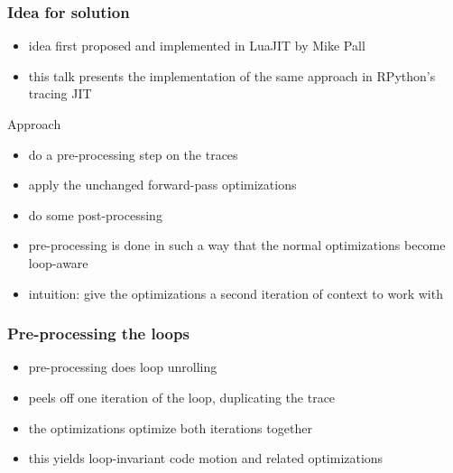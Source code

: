 \documentclass[utf8x]{beamer}
\begin{document}
\begin{frame}
  \frametitle{Idea for solution}
  \begin{itemize}
      \item idea first proposed and implemented in LuaJIT by Mike Pall
      \item this talk presents the implementation of the same approach in RPython's tracing JIT
  \end{itemize}
  \pause
  \begin{block}{Approach}
      \begin{itemize}
          \item do a pre-processing step on the traces
          \item apply the unchanged forward-pass optimizations
          \item do some post-processing
          \item pre-processing is done in such a way that the normal optimizations become loop-aware
          \item intuition: give the optimizations a second iteration of context to work with
      \end{itemize}
  \end{block}
\end{frame}

\begin{frame}
  \frametitle{Pre-processing the loops}
  \begin{itemize}
      \item pre-processing does loop unrolling
      \item peels off one iteration of the loop, duplicating the trace
      \item the optimizations optimize both iterations together
      \item this yields loop-invariant code motion and related optimizations
  \end{itemize}
\end{frame}
\end{document}
